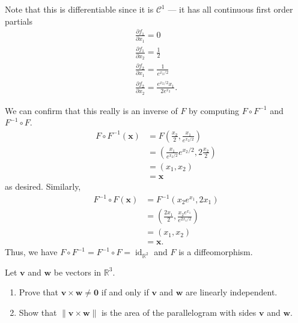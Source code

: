 \documentclass[12 pt, letterpaper]{hmcpset}
\begin{document}
\begin{solution}
\begin{enumerate}
			Note that this is differentiable since it is $\mathcal{C}^1$ --- it has all continuous first order partials
			\[
				\begin{gathered}
					\frac{\partial f_1}{\partial x_1} = 0 \\
					\frac{\partial f_1}{\partial x_2} = \frac{1}{2} \\
					\frac{\partial f_2}{\partial x_1} = \frac{1}{e^{x_2/2}} \\
					\frac{\partial f_2}{\partial x_2} = \frac{e^{x_2/2} x_1}{2 e^{x_2}}.
				\end{gathered}
			\] 

			We can confirm that this really is an inverse of $F$ by computing $F \circ F^{-1}$ and $F^{-1} \circ F$.
			\[
				\begin{split}
					F \circ F^{-1}(\mathbf{x}) & = F(\frac{x_2}{2}, \frac{x_1}{e^{x_2/2}}) \\
								   & = \left ( \frac{x_1}{e^{x_2/2}} e^{x_2/2}, 2 \frac{x_2}{2} \right ) \\
								   & = \left ( x_1, x_2 \right ) \\
								   & = \mathbf{x}
				\end{split}
			\]
			as desired. Similarly,
			\[
				\begin{split}
					F^{-1} \circ F(\mathbf{x}) & = F^{-1}(x_2 e^{x_1}, 2 x_1) \\
								   & = (\frac{2 x_1}{2}, \frac{x_2 e^{x_1}}{e^{2x_1/2}}) \\
								   & = (x_1, x_2) \\
								   & = \mathbf{x}.
				\end{split}
			\]
			Thus, we have $F \circ F^{-1} = F^{-1} \circ F = \operatorname{id}_{\mathbb{R}^2}$ and $F$ is a diffeomorphism.
	\end{enumerate}
\end{solution}

\pagebreak

\begin{problem}[Problem 3.]
	Let $\mathbf{v}$ and $\mathbf{w}$ be vectors in $\mathbb{R}^3$.
	\begin{enumerate}
		\item Prove that $\mathbf{v} \times \mathbf{w} \neq \mathbf{0}$ if and only if $\mathbf{v}$ and $\mathbf{w}$ are linearly independent.
		\item Show that $\lVert \mathbf{v} \times \mathbf{w} \rVert$ is the area of the parallelogram with sides $\mathbf{v}$ and $\mathbf{w}$.
	\end{enumerate}
\end{problem}
\end{document}
